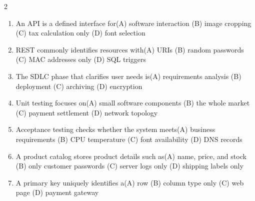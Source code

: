 \documentclass[a4paper]{article}
\begin{document}
\begin{multicols*}{2}
\begin{enumerate}
\item An API is a defined interface for\newline\hspace*{0.6em}(A) software interaction \quad (B) image cropping \newline\hspace*{0.6em}(C) tax calculation only \quad (D) font selection
\item REST commonly identifies resources with\newline\hspace*{0.6em}(A) URIs \quad (B) random passwords \newline\hspace*{0.6em}(C) MAC addresses only \quad (D) SQL triggers
\item The SDLC phase that clarifies user needs is\newline\hspace*{0.6em}(A) requirements analysis \quad (B) deployment \newline\hspace*{0.6em}(C) archiving \quad (D) encryption
\item Unit testing focuses on\newline\hspace*{0.6em}(A) small software components \quad (B) the whole market \newline\hspace*{0.6em}(C) payment settlement \quad (D) network topology
\item Acceptance testing checks whether the system meets\newline\hspace*{0.6em}(A) business requirements \quad (B) CPU temperature \newline\hspace*{0.6em}(C) font availability \quad (D) DNS records
\item A product catalog stores product details such as\newline\hspace*{0.6em}(A) name, price, and stock \quad (B) only customer passwords \newline\hspace*{0.6em}(C) server logs only \quad (D) shipping labels only
\item A primary key uniquely identifies a\newline\hspace*{0.6em}(A) row \quad (B) column type only \newline\hspace*{0.6em}(C) web page \quad (D) payment gateway

\end{enumerate}
\end{multicols*}
\end{document}
